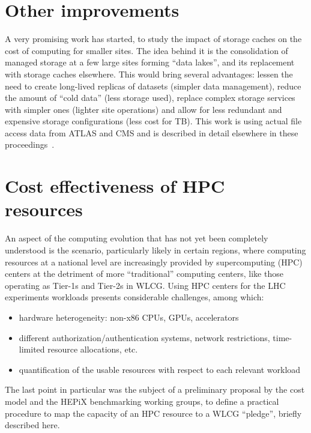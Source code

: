 \section{Other improvements}
A very promising work has started, to study the impact of storage
caches on the cost of computing for smaller sites. The idea behind it
is the consolidation of managed storage at a few large sites forming
``data lakes'', and its replacement with storage caches
elsewhere. This would bring several advantages: lessen the need to
create long-lived replicas of datasets (simpler data management),
reduce the amount of ``cold data'' (less storage used), replace
complex storage services with simpler ones (lighter site operations)
and allow for less redundant and expensive storage configurations
(less cost for TB). This work is using actual file access data from
ATLAS and CMS and is described in detail elsewhere in these
proceedings~\cite{cache}.

\section{Cost effectiveness of HPC resources}
An aspect of the computing evolution that has not yet been completely
understood is the scenario, particularly likely in certain regions,
where computing resources at a national level are increasingly
provided by supercomputing (HPC) centers at the detriment of more
``traditional'' computing centers, like those operating as Tier-1s and
Tier-2s in WLCG. Using HPC centers for the LHC experiments workloads
presents considerable challenges, among which:
\begin{itemize}
\item hardware heterogeneity: non-x86 CPUs, GPUs, accelerators
\item different authorization/authentication systems, network
  restrictions, time-limited resource allocations, etc.
\item quantification of the usable resources with respect to each
  relevant workload
\end{itemize}

The last point in particular was the subject of a preliminary proposal
by the cost model and the HEPiX benchmarking working groups, to define
a practical procedure to map the capacity of an HPC resource to a WLCG
``pledge'', briefly described here.

